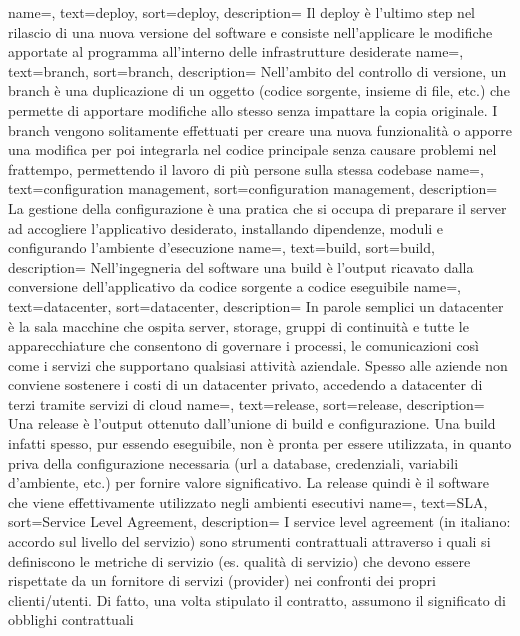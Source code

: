 {
	name=,
	text=deploy,
	sort=deploy,
	description={ Il deploy è l'ultimo step nel rilascio di una nuova versione del software e consiste nell'applicare le modifiche apportate al programma all'interno delle infrastrutture desiderate}
}
{
	name=,
	text=branch,
	sort=branch,
	description={ Nell'ambito del controllo di versione, un branch è una duplicazione di un oggetto (codice sorgente, insieme di file, etc.) che permette di apportare modifiche allo stesso senza impattare la copia originale. I branch vengono solitamente effettuati per creare una nuova funzionalità o apporre una modifica per poi integrarla nel codice principale senza causare problemi nel frattempo, permettendo il lavoro di più persone sulla stessa codebase}
}
{
	name=,
	text=configuration management,
	sort=configuration management,
	description={ La gestione della configurazione è una pratica che si occupa di preparare il server ad accogliere l'applicativo desiderato, installando dipendenze, moduli e configurando l'ambiente d'esecuzione}
}
{
	name=,
	text=build,
	sort=build,
	description={ Nell'ingegneria del software una build è l'output ricavato dalla conversione dell'applicativo da codice sorgente a codice eseguibile}
}
{
	name=,
	text=datacenter,
	sort=datacenter,
	description={ In parole semplici un datacenter è la sala macchine che ospita server, storage, gruppi di continuità e tutte le apparecchiature che consentono di governare i processi, le comunicazioni così come i servizi che supportano qualsiasi attività aziendale. Spesso alle aziende non conviene sostenere i costi di un datacenter privato, accedendo a datacenter di terzi tramite servizi di cloud}
}
{
	name=,
	text=release,
	sort=release,
	description={ Una release è l'output ottenuto dall'unione di build e configurazione. Una build infatti spesso, pur essendo eseguibile, non è pronta per essere utilizzata, in quanto priva della configurazione necessaria (url a database, credenziali, variabili d'ambiente, etc.) per fornire valore significativo. La release quindi è il software che viene effettivamente utilizzato negli ambienti esecutivi}
}
{
	name=,
	text=SLA,
	sort=Service Level Agreement,
	description={ I service level agreement (in italiano: accordo sul livello del servizio) sono strumenti contrattuali attraverso i quali si definiscono le metriche di servizio (es. qualità di servizio) che devono essere rispettate da un fornitore di servizi (provider) nei confronti dei propri clienti/utenti. Di fatto, una volta stipulato il contratto, assumono il significato di obblighi contrattuali}
}

